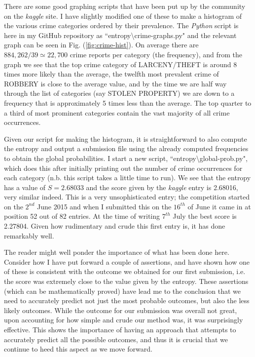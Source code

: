 \documentclass[12pt,notitlepage]{article}
\begin{document}
%
There are some good graphing scripts that have been put up by the community on the \emph{kaggle} site. I have slightly modified one of these to make a histogram of the various crime categories ordered by their prevalence. The \emph{Python} script is here in my GitHub repository as ``entropy\textbackslash crime-graphs.py" and the relevant graph can be seen in Fig. (\ref{fig:crime-hist}). On average there are $884,262 / 39 \simeq 22,700$ crime reports per category (the frequency), and from the graph we see that the top crime category of LARCENY/THEFT is around 8 times more likely than the average, the twelfth most prevalent crime of ROBBERY is close to the average value, and by the time we are half way through the list of categories (say STOLEN PROPERTY) we are down to a frequency that is approximately 5 times less than the average. The top quarter to a third of most prominent categories contain the vast majority of all crime occurrences.  

Given our script for making the histogram, it is straightforward to also compute the entropy and output a submission file using the already computed
frequencies to obtain the global probabilities. I start a new script, ``entropy\textbackslash global-prob.py", which does this after initially printing out the
number of crime occurrences for each category (n.b. this script takes a little time to run). We see that the entropy has a value of $S = 2.68033$ and the
score given by the \emph{kaggle} entry is 2.68016, very similar indeed. This is a very unsophisticated entry; the competition started on the $2^{nd}$
June 2015 and when I submitted this on the $16^{th}$ of June it came in at position 52 out of 82 entries. At the time of writing $7^{th}$ July the best score is 2.27804. Given how rudimentary and crude this first entry is, it has done remarkably well.  

The reader might well ponder the importance of what has been done here. Consider how I have put forward a couple of assertions, and have shown how one of these is consistent with the outcome we obtained for our first submission, i.e. the score was extremely close to the value given by the entropy. These assertions (which can be mathematically proved) have lead me to the conclusion that we need to accurately predict not just the most probable outcomes, but also the less likely outcomes. While the outcome for our submission was overall not great, upon accounting for how simple and crude our method was, it was surprisingly effective. This shows the importance of having an approach that attempts to accurately predict all the possible outcomes, and thus it is crucial that we continue to heed this aspect as we move forward. 
\end{document}

